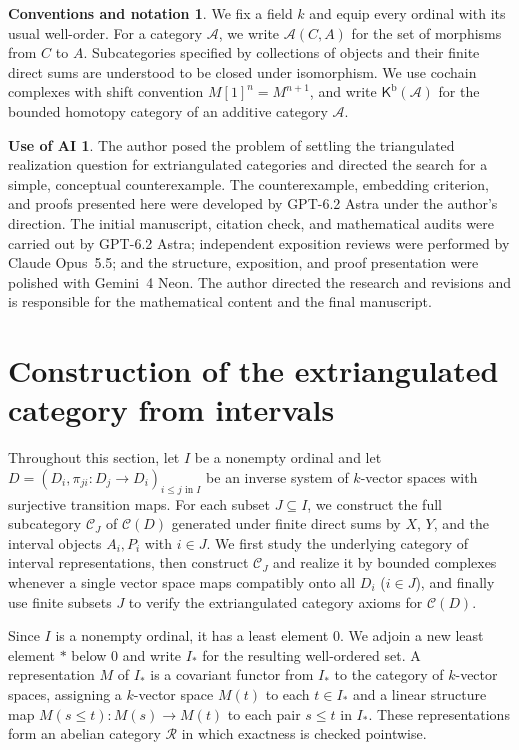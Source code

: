 \documentclass[a4paper,reqno,10pt]{amsart}
\numberwithin{equation}{section}
\theoremstyle{definition}
\newtheorem*{conventions}{Conventions and notation}
\newtheorem*{aiuse}{Use of AI}
\newcommand{\C}{\mathcal C}
\newcommand{\Rcat}{\mathcal R}
\newcommand{\Kb}{\mathsf K^{\mathrm b}}
\begin{document}
\begin{conventions}
We fix a field $k$ and equip every ordinal with its usual well-order. For a
category $\mathcal A$, we write $\mathcal A(C,A)$ for the set of morphisms from
$C$ to $A$. Subcategories specified by collections of objects and their finite
direct sums are understood to be closed under isomorphism. We use cochain
complexes with shift convention $M[1]^n=M^{n+1}$, and write $\Kb(\mathcal A)$
for the bounded homotopy category of an additive category $\mathcal A$.
\end{conventions}

\begin{aiuse}
The author posed the problem of settling the triangulated realization question
for extriangulated categories and directed the search for a simple, conceptual
counterexample. The counterexample, embedding criterion, and proofs presented
here were developed by GPT-6.2 Astra under the author's direction. The initial
manuscript, citation check, and mathematical audits were carried out by
GPT-6.2 Astra; independent exposition reviews were performed by Claude
Opus~5.5; and the structure, exposition, and proof presentation were polished
with Gemini~4 Neon. The author directed the research and revisions and is
responsible for the mathematical content and the final manuscript.
\end{aiuse}

\section{Construction of the extriangulated category from intervals}\label{sec:intervals}

Throughout this section, let $I$ be a nonempty ordinal and let
$D=(D_i,\pi_{ji}:D_j\to D_i)_{i\le j\text{ in }I}$ be an inverse system of
$k$-vector spaces with surjective transition maps. For each subset
$J\subseteq I$, we construct the full subcategory $\C_J$ of $\C(D)$ generated
under finite direct sums by $X$, $Y$, and the interval objects $A_i,P_i$ with
$i\in J$. We first study the underlying category of interval representations,
then construct $\C_J$ and realize it by bounded complexes whenever a single
vector space maps compatibly onto all $D_i$ ($i\in J$), and finally use finite
subsets $J$ to verify the extriangulated category axioms for $\C(D)$.

Since $I$ is a nonempty ordinal, it has a least element $0$. We adjoin a new
least element $*$ below $0$ and write $I_*$ for the resulting well-ordered set.
A representation $M$ of $I_*$ is a covariant functor from $I_*$ to the category
of $k$-vector spaces, assigning a $k$-vector space $M(t)$ to each $t\in I_*$
and a linear structure map $M(s\le t):M(s)\to M(t)$ to each pair $s\le t$ in
$I_*$. These representations form an abelian category $\Rcat$ in which
exactness is checked pointwise.
\end{document}
